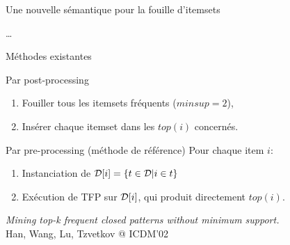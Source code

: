 \documentclass[table]{beamer}
\begin{document}
\begin{frame}[t]{Une nouvelle sémantique pour la fouille d'itemsets}
\begin{footnotesize}
\begin{center}
    \ldots

    \end{center}


  \end{footnotesize}
\end{frame}

\begin{frame}{Méthodes existantes}
  \pause
  \begin{block}{Par post-processing}
    \begin{enumerate}
      \item Fouiller tous les itemsets fréquents ($minsup = 2$),
      \item Insérer chaque itemset dans les $top(i)$ concernés.
    \end{enumerate}
  \end{block}
  \pause
  \begin{block}{Par pre-processing (méthode de référence)}
    Pour chaque item $i$:
    \begin{enumerate}
      \item Instanciation de ${\cal D}[i]=\{t \in {\cal D} | i \in t\}$
      \item Exécution de TFP sur ${\cal D}[i]$, qui produit directement $\mathit{top}(i).$
    \end{enumerate}
  \end{block}
  \vfill
  \begin{footnotesize}
    {\em Mining top-k frequent closed patterns without minimum support.}\\
    Han, Wang, Lu, Tzvetkov @ ICDM'02
  \end{footnotesize}
\end{frame}
\end{document}
